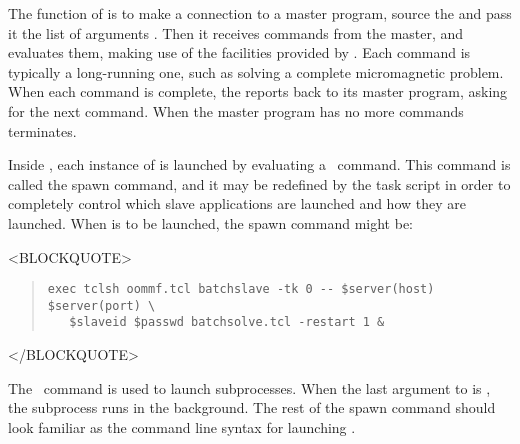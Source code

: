 The function of  is to make a connection to
a master program, source the  and pass it the
list of arguments .  Then it receives commands
from the master, and evaluates them, making use of the
facilities provided by .  Each command is typically a
long-running one, such as solving a complete micromagnetic problem.
When each command is complete, the  reports back to 
its master program, asking for the next command.  When the master
program has no more commands  terminates.

Inside , each instance of  is
launched by evaluating a \Tcl\ command.  This command is called
the spawn command, and it may be redefined by the task script
in order to completely control which slave applications are launched
and how they are launched.  When  is to be launched,
the spawn command might be:
\begin{rawhtml}<BLOCKQUOTE>\end{rawhtml}
\begin{quote}
\begin{verbatim}
exec tclsh oommf.tcl batchslave -tk 0 -- $server(host) $server(port) \
   $slaveid $passwd batchsolve.tcl -restart 1 &
\end{verbatim}
\end{quote}
\begin{rawhtml}</BLOCKQUOTE>\end{rawhtml}
The \Tcl\ command  is used to launch subprocesses.  When
the last argument to \cd{exec} is \cd{\&}, the subprocess runs in
the background.  The rest of the spawn command should look familiar
as the command line syntax for launching \app{batchslave}.

